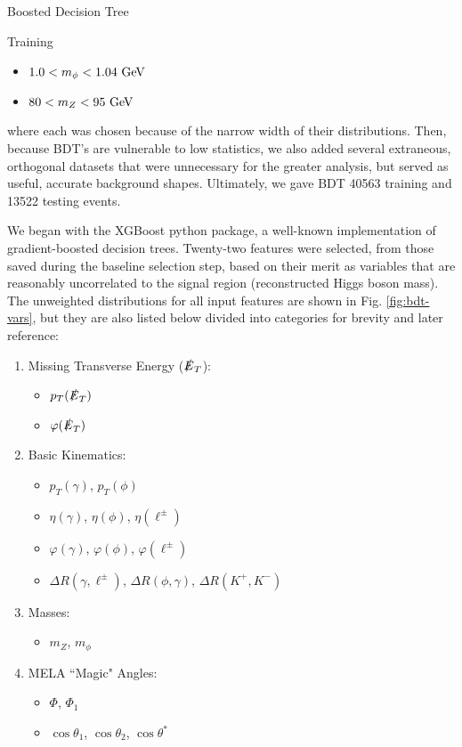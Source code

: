 \begin{section}{Boosted Decision Tree}
\begin{subsection}{Training}
\begin{itemize}
    \item $1.0 < m_{\phi} < 1.04\textnormal{ GeV}$
    \item $80 < m_{Z} < 95\textnormal{ GeV}$
\end{itemize}

\noindent where each was chosen because of the narrow width of their distributions. Then, because BDT's are vulnerable to low statistics, we also added several extraneous, orthogonal datasets that were unnecessary for the greater analysis, but served as useful, accurate background shapes. Ultimately, we gave BDT 40563 training and 13522 testing events.

We began with the XGBoost python package, a well-known implementation of gradient-boosted decision trees. Twenty-two features were selected, from those saved during the baseline selection step, based on their merit as variables that are reasonably uncorrelated to the signal region (reconstructed Higgs boson mass). The unweighted distributions for all input features are shown in Fig. \ref{fig:bdt-vars}, but they are also listed below divided into categories for brevity and later reference:
\begin{enumerate}[(i.)]
    \item Missing Transverse Energy ($\slashed{E}_{T}$):
    \begin{itemize}
        \item $p_{T}(\slashed{E}_{T})$
        \item $\varphi(\slashed{E}_{T})$
    \end{itemize}
    \item Basic Kinematics:
    \begin{itemize}
        \item $p_{T}(\gamma)$, $p_{T}(\phi)$
        \item $\eta(\gamma)$, $\eta(\phi)$, $\eta(\ell^{\pm})$
        \item $\varphi(\gamma)$, $\varphi(\phi)$, $\varphi(\ell^{\pm})$
        \item $\Delta R(\gamma, \ell^{\pm})$, $\Delta R(\phi, \gamma)$, $\Delta R(K^{+}, K^{-})$
    \end{itemize}
    \item Masses:
    \begin{itemize}
        \item $m_{Z}$, $m_{\phi}$
    \end{itemize}
    \item MELA ``Magic" Angles:
    \begin{itemize}
        \item $\Phi$, $\Phi_{1}$
        \item $\cos\theta_{1}$, $\cos\theta_{2}$, $\cos\theta^{*}$
    \end{itemize}
\end{enumerate}


\end{subsection}
\end{section}
